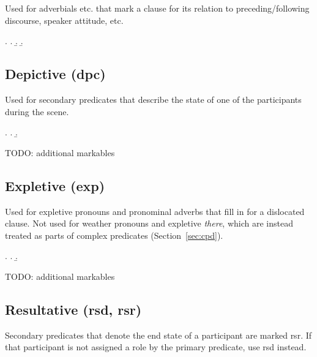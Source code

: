 \documentclass[a4paper]{article}
\begin{document}
Used for adverbials etc. that mark a clause for its relation to preceding/following discourse, speaker attitude, etc.

\ex.
\a. 
\b. 
\b. 


\clearpage
\subsection{Depictive (\textsf{dpc})}
\label{sec:dpc}

Used for secondary predicates that describe the state of one of the participants during the scene.

\ex.
\a. 
\b. 

TODO: additional markables


\clearpage
\subsection{Expletive (\textsf{exp})}
\label{sec:exp}

Used for expletive pronouns and pronominal adverbs that fill in for a
dislocated clause. Not used for weather pronouns and expletive \emph{there},
which are instead treated as parts of complex predicates
(Section~\ref{sec:cpd}).

\ex.
\a. 
\b. 

TODO: additional markables


\clearpage
\subsection{Resultative (\textsf{rsd}, \textsf{rsr})}
\label{sec:rsd}\label{sec:rsr}

Secondary predicates that denote the end state of a participant are marked
\textsf{rsr}. If that participant is not assigned a role by the primary
predicate, use \textsf{rsd} instead.
\end{document}
